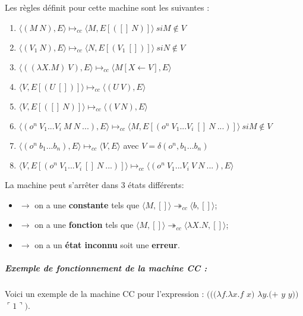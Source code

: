 \documentclass[10pt,a4paper]{report}
\begin{document}
Les règles définit pour cette machine sont les suivantes :
\begin{enumerate}
  
\item $\langle(M~N),E\rangle \longmapsto_{cc} \langle M,E[([]~N)]\rangle~si M \notin V$
  
\item $\langle(V_{1}~N),E\rangle \longmapsto_{cc}  \langle N,E[(V_{1}~[])]\rangle~si N \notin V$
  
\item $\langle((\lambda X.M)~V),E\rangle \longmapsto_{cc} \langle M[X\longleftarrow V],E\rangle$
  
\item $\langle V,E[(U~[])]\rangle \longmapsto_{cc} \langle(U~V),E\rangle$
  
\item $\langle V,E[([]~N)]\rangle \longmapsto_{cc} \langle(V~N),E\rangle$ 
  
\item $\langle(o^{n}~V_{1}...V_{i}~M~N~...),E\rangle \longmapsto_{cc}  
  \langle M,E[(o^{n}~V_{1}...V_{i}~[]~N~...)]\rangle~ si M \notin V$
  
\item $\langle(o^{n}~b_{1}...b_{n}),E\rangle \longmapsto_{cc}  \langle V,E\rangle$ avec $V = \delta(o^{n},b_{1}...b_{n})$ 
  
\item $\langle V,E[(o^{n}~V_{1}...V_{i}~[]~N~...)]\rangle \longmapsto_{cc} \langle(o^{n}~V_{1}...V_{i}~V~N ~...),E\rangle$ 
\end{enumerate}
\bigbreak


La machine peut s'arrêter dans 3 états différents:
\begin{itemize}
\item[]$\longrightarrow$ on a une \textbf{constante} tels que $\langle M,[]\rangle \twoheadrightarrow_{cc} \langle b,[]\rangle$;
\item[]$\longrightarrow$ on a une \textbf{fonction} tels que $\langle M,[]\rangle \twoheadrightarrow_{cc} \langle\lambda X.N,[]\rangle$;
\item[]$\longrightarrow$ on a un \textbf{état inconnu} soit une \textbf{erreur}.
\end{itemize}
\bigbreak


\subparagraph{Exemple de fonctionnement de la machine CC :}
Voici un exemple de la machine CC pour l'expression : 
\smallbreak 
$(((\lambda f.\lambda x.f$ $x)$ $\lambda y.(+$ $y$ $y))$ $\ulcorner 1\urcorner)$.
\end{document}
